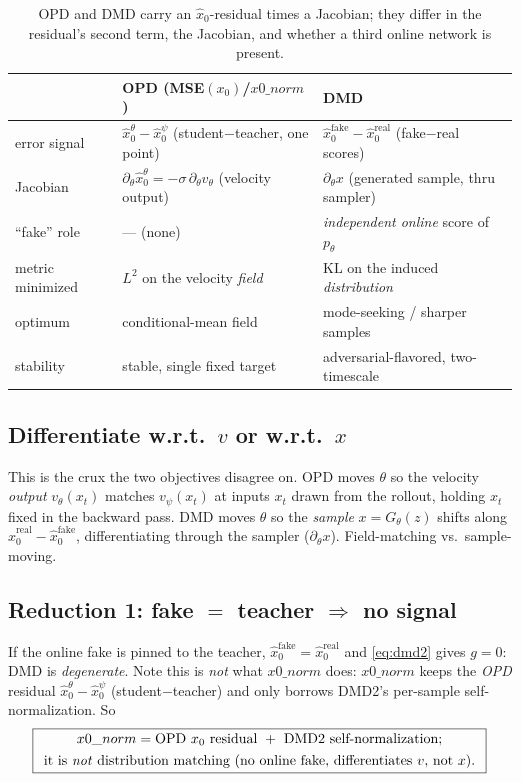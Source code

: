 \documentclass[11pt,a4paper]{article}
\newcommand{\KL}{\mathrm{KL}}
\newcommand{\xh}{\hat{x}_0}
\newcommand{\real}{\mathrm{real}}
\newcommand{\fake}{\mathrm{fake}}
\begin{document}
\begin{table}[h]\centering\small
\begin{tabular}{@{}lll@{}}
\toprule
& \textbf{OPD} (MSE$(x_0)$/$x0\_norm$) & \textbf{DMD} \\
\midrule
error signal & $\xh^\theta-\xh^\psi$ (student$-$teacher, one point) & $\xh^{\fake}-\xh^{\real}$ (fake$-$real scores)\\
Jacobian & $\partial_\theta \xh^\theta=-\sigma\,\partial_\theta v_\theta$ (velocity output) & $\partial_\theta x$ (generated sample, thru sampler)\\
``fake'' role & --- (none) & \emph{independent online} score of $p_\theta$\\
metric minimized & $L^2$ on the velocity \emph{field} & $\KL$ on the induced \emph{distribution}\\
optimum & conditional-mean field & mode-seeking / sharper samples\\
stability & stable, single fixed target & adversarial-flavored, two-timescale\\
\bottomrule
\end{tabular}
\caption{OPD and DMD carry an $\xh$-residual times a Jacobian; they differ in the residual's second
term, the Jacobian, and whether a third online network is present.}
\label{tab:cmp}
\end{table}

\subsection{Differentiate w.r.t.\ $v$ or w.r.t.\ $x$}
This is the crux the two objectives disagree on. OPD moves $\theta$ so the velocity \emph{output}
$v_\theta(x_t)$ matches $v_\psi(x_t)$ at inputs $x_t$ drawn from the rollout, holding $x_t$ fixed in
the backward pass. DMD moves $\theta$ so the \emph{sample} $x=G_\theta(z)$ shifts along
$\xh^{\real}-\xh^{\fake}$, differentiating through the sampler ($\partial_\theta x$). Field-matching
vs.\ sample-moving.

\subsection{Reduction 1: fake $=$ teacher $\Rightarrow$ no signal}
If the online fake is pinned to the teacher, $\xh^{\fake}=\xh^{\real}$ and \eqref{eq:dmd2} gives
$g=0$: DMD is \emph{degenerate}. Note this is \emph{not} what $x0\_norm$ does: $x0\_norm$ keeps the
\emph{OPD} residual $\xh^\theta-\xh^\psi$ (student$-$teacher) and only borrows DMD2's per-sample
self-normalization. So
\begin{equation*}
\boxed{\parbox{0.92\linewidth}{\centering
$x0\_norm=\text{OPD }x_0\text{ residual }+\text{ DMD2 self-normalization}$;\\[0.35em]
it is \emph{not} distribution matching (no online fake, differentiates $v$, not $x$).}}
\end{equation*}
\end{document}
